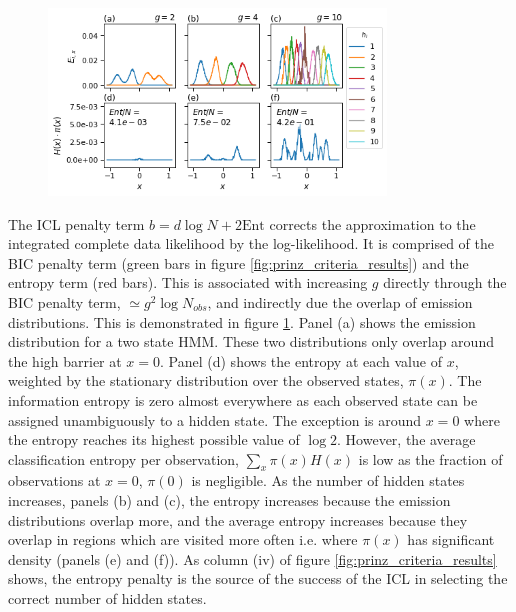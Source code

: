 \begin{figure}
    \centering
    \includegraphics[width=0.8\textwidth]{chapters/hmm_selection/figures/prinz_entropy.png}
    \label{fig:prinz_ent}
\end{figure}

The ICL penalty term $b=d\log{N}+2\mathrm{Ent}$ corrects the approximation to the integrated complete data likelihood by the log-likelihood. It is comprised of the BIC penalty term (green bars in figure \ref{fig:prinz_criteria_results}) and the entropy term (red bars). This is associated with increasing $g$ directly through the BIC penalty term, $\simeq g^{2}\log{N_{obs}}$,  and indirectly due the overlap of emission distributions. This is demonstrated in figure \ref{fig:prinz_ent}. Panel (a) shows the emission distribution for a two state HMM. These two distributions only overlap around the high barrier at $x=0$. Panel (d) shows the entropy at each value of $x$, weighted by the stationary distribution over the observed states, $\pi(x)$. The information entropy is zero almost everywhere as each observed state can be assigned unambiguously to a hidden state. The exception is around $x=0$ where the entropy reaches its highest possible value of $\log{2}$. However, the average classification entropy per observation, $\sum_{x}\pi(x)H(x)$ is low as the fraction of observations at $x=0$, $\pi(0)$ is negligible. As the number of hidden states increases, panels (b) and (c), the  entropy increases because the emission distributions overlap more, and the average entropy increases because they overlap in regions which are visited more often i.e. where $\pi(x)$ has significant density (panels (e) and (f)). As column (iv) of figure \ref{fig:prinz_criteria_results} shows, the entropy penalty is the source of the success of the ICL in selecting  the correct number of hidden states. 

